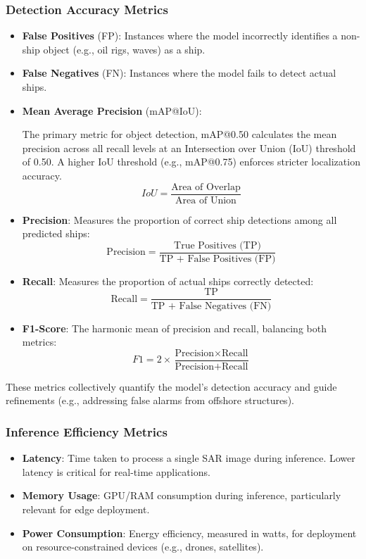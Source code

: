 \documentclass{article}
\begin{document}
	\subsubsection{Detection Accuracy Metrics}
	\begin{itemize}
		\item \textbf{False Positives} (FP): Instances where the model incorrectly identifies a non-ship object (e.g., oil rigs, waves) as a ship. \item \textbf{False Negatives} (FN): Instances where the model fails to detect actual ships. \item \textbf{Mean Average Precision} (mAP@IoU):
		
		The primary metric for object detection, mAP@0.50 calculates the mean precision across all recall levels at an Intersection over Union (IoU) threshold of 0.50. A higher IoU threshold (e.g., mAP@0.75) enforces stricter localization accuracy. $$IoU=\frac{\text{Area of Overlap}}{\text{Area of Union}}$$
		\item \textbf{Precision}: Measures the proportion of correct ship detections among all predicted ships: $$\text{Precision} = \frac{\text{True Positives (TP)}}{\text{TP + False Positives (FP)}}$$
		
		\item \textbf{Recall}: Measures the proportion of actual ships correctly detected:$$\text{Recall} = \frac{\text{TP}}{\text{TP + False Negatives (FN)}}$$
		
		\item \textbf{F1-Score}: The harmonic mean of precision and recall, balancing both metrics:
		$$F1 = 2 \times \frac{\text{Precision} \times \text{Recall}}{\text{Precision} + \text{Recall}}$$
	\end{itemize}
	
	These metrics collectively quantify the model’s detection accuracy and guide refinements (e.g., addressing false alarms from offshore structures).
	
	\subsubsection{Inference Efficiency Metrics}
	\begin{itemize}
		\item \textbf{Latency}: Time taken to process a single SAR image during inference. Lower latency is critical for real-time applications.
		
		\item \textbf{Memory Usage}: GPU/RAM consumption during inference, particularly relevant for edge deployment. \item \textbf{Power Consumption}: Energy efficiency, measured in watts, for deployment on resource-constrained devices (e.g., drones, satellites). \end{itemize}
	
\end{document}
